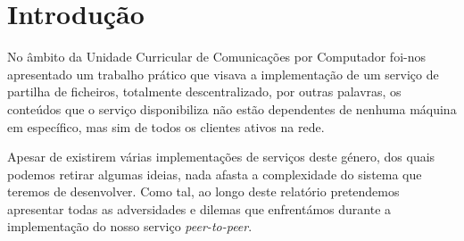 \section{Introdução}

    No âmbito da Unidade Curricular de Comunicações por Computador foi-nos apresentado um trabalho prático que visava a implementação de um serviço de partilha de ficheiros, totalmente descentralizado, por outras palavras, os conteúdos que o serviço disponibiliza não estão dependentes de nenhuma máquina em específico, mas sim de todos os clientes ativos na rede.

    Apesar de existirem várias implementações de serviços deste género, dos quais podemos retirar algumas ideias, nada afasta a complexidade do sistema que teremos de desenvolver. Como tal, ao longo deste relatório pretendemos apresentar todas as adversidades e dilemas que enfrentámos durante a implementação do nosso serviço \textit{peer-to-peer}.